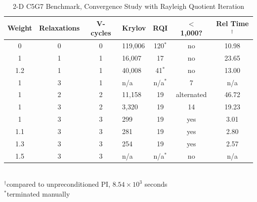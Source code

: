 \documentclass[preprint,12pt]{elsarticle}
\begin{document}
%
\begin{table}[!h]
\caption{2-D C5G7 Benchmark, Convergence Study with Rayleigh Quotient Iteration}
\begin{center}
\begin{tabular}{| c | c | c | l | c | c | c |}
\hline
Weight & Relaxations & V-cycles & Krylov & RQI & $<$ 1,000? & Rel Time$^{\dag}$\\[0.5ex]
\hline
0    & 0 & 0 & 119,006 & 120$^{*}$ & no & 10.98 \\%
1    & 1 & 1 & 16,007   & 17            & no & 23.65 \\ %
1.2 & 1 & 1 & 40,008   & 41$^{*}$   & no & 13.00 \\ %
1    & 3 & 1 & n/a         & n/a$^{*}$  & 7   & n/a \\
1    & 2 & 2 & 11,158   & 19            & alternated & 46.72 \\ %
1    & 3 & 2 & 3,320     & 19            & 14 &19.23 \\ %
\hline
1    & 3 & 3 & 299        & 19            & yes & 3.01 \\ %
1.1 & 3 & 3 & 281        & 19            & yes & 2.80 \\ %
1.3 & 3 & 3 & 254        & 19            & yes & 2.57 \\ %
1.5 & 3 & 3 & n/a         & n/a$^{*}$ & no & n/a \\
\hline 
\end{tabular} \\
$^{\dag}$compared to unpreconditioned PI, $8.54 \times 10^{3}$ seconds\\
$^{*}$terminated manually
\end{center}
\label{table:2-D c5g7 rqi}
\end{table}
%
\end{document}
